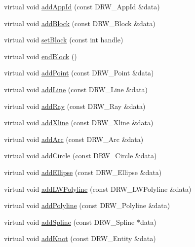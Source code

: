 \begin{DoxyCompactItemize}
\item 
virtual void \hyperlink{class_c_d_x_interface_a07dd5babfdbc85c8f8971877ce88e516}{add\+App\+Id} (const D\+R\+W\+\_\+\+App\+Id \&data)
\item 
virtual void \hyperlink{class_c_d_x_interface_a2fb0910a417432478d489d2d6fa60c47}{add\+Block} (const D\+R\+W\+\_\+\+Block \&data)
\item 
virtual void \hyperlink{class_c_d_x_interface_a3e86b18e51554894bcb55c37eb2987cf}{set\+Block} (const int handle)
\item 
virtual void \hyperlink{class_c_d_x_interface_a92c67628710ba11220e13df05665aab5}{end\+Block} ()
\item 
virtual void \hyperlink{class_c_d_x_interface_a13945213fcac765a575f2c4810c800a9}{add\+Point} (const D\+R\+W\+\_\+\+Point \&data)
\item 
virtual void \hyperlink{class_c_d_x_interface_abce6fe9c6df13e9c9d5de49186d9a375}{add\+Line} (const D\+R\+W\+\_\+\+Line \&data)
\item 
virtual void \hyperlink{class_c_d_x_interface_af4a7bdbe3af0ba6cc1841dc2a07084a2}{add\+Ray} (const D\+R\+W\+\_\+\+Ray \&data)
\item 
virtual void \hyperlink{class_c_d_x_interface_aad1fbc1c6389189ef1c51adae00ea6ad}{add\+Xline} (const D\+R\+W\+\_\+\+Xline \&data)
\item 
virtual void \hyperlink{class_c_d_x_interface_a7a65ab2dac9359264440b7f4c13791cd}{add\+Arc} (const D\+R\+W\+\_\+\+Arc \&data)
\item 
virtual void \hyperlink{class_c_d_x_interface_a861f95b2b9daf3001006ab2406836bbf}{add\+Circle} (const D\+R\+W\+\_\+\+Circle \&data)
\item 
virtual void \hyperlink{class_c_d_x_interface_a7c192903316961f2b7c08d03b20b6912}{add\+Ellipse} (const D\+R\+W\+\_\+\+Ellipse \&data)
\item 
virtual void \hyperlink{class_c_d_x_interface_a29cd90ce07f0c2160a7f1ccf0a12e3bc}{add\+L\+W\+Polyline} (const D\+R\+W\+\_\+\+L\+W\+Polyline \&data)
\item 
virtual void \hyperlink{class_c_d_x_interface_ac3fdc3eb5469b6e77e0e1440957e7466}{add\+Polyline} (const D\+R\+W\+\_\+\+Polyline \&data)
\item 
virtual void \hyperlink{class_c_d_x_interface_af4bd6a307821cb9ddfa59a6c2a113f71}{add\+Spline} (const D\+R\+W\+\_\+\+Spline $\ast$data)
\item 
virtual void \hyperlink{class_c_d_x_interface_ad8ca9b2500438f0ca803d649c000fd95}{add\+Knot} (const D\+R\+W\+\_\+\+Entity \&data)

\end{DoxyCompactItemize}
